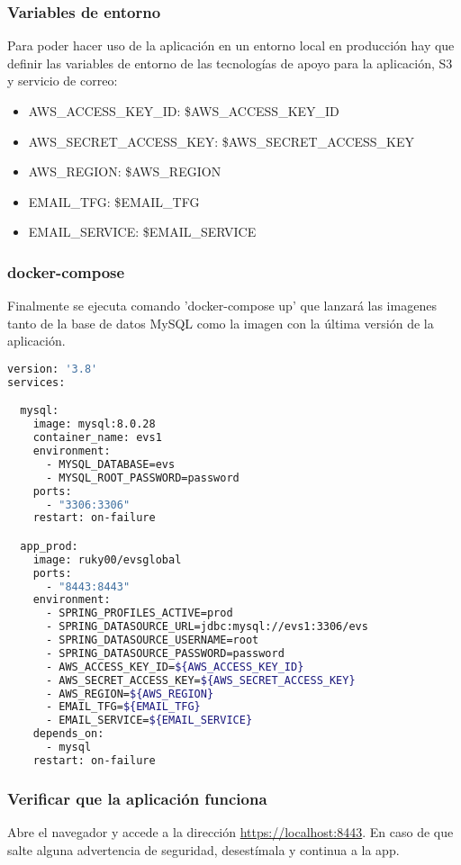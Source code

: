 \subsubsection{Variables de entorno}
Para poder hacer uso de la aplicación en un entorno local en producción hay que definir las variables de entorno de las tecnologías de apoyo para la aplicación, S3 y servicio de correo:
\begin{itemize}
    \item AWS\_ACCESS\_KEY\_ID: \${AWS\_ACCESS\_KEY\_ID}
    \item AWS\_SECRET\_ACCESS\_KEY: \${AWS\_SECRET\_ACCESS\_KEY}
    \item AWS\_REGION: \${AWS\_REGION}
    \item EMAIL\_TFG: \${EMAIL\_TFG}
    \item EMAIL\_SERVICE: \${EMAIL\_SERVICE}
\end{itemize}

\subsubsection{docker-compose}
Finalmente se ejecuta comando 'docker-compose up' que lanzará las imagenes tanto de la base de datos MySQL como la imagen con la última versión de la aplicación.
\begin{lstlisting}[language=Bash, caption=Lanzar contenedores Docker, label=lst:docker-compose]
version: '3.8'
services:

  mysql:
    image: mysql:8.0.28
    container_name: evs1
    environment:
      - MYSQL_DATABASE=evs
      - MYSQL_ROOT_PASSWORD=password
    ports:
      - "3306:3306"
    restart: on-failure

  app_prod:
    image: ruky00/evsglobal
    ports:
      - "8443:8443"
    environment:
      - SPRING_PROFILES_ACTIVE=prod
      - SPRING_DATASOURCE_URL=jdbc:mysql://evs1:3306/evs
      - SPRING_DATASOURCE_USERNAME=root
      - SPRING_DATASOURCE_PASSWORD=password
      - AWS_ACCESS_KEY_ID=${AWS_ACCESS_KEY_ID}
      - AWS_SECRET_ACCESS_KEY=${AWS_SECRET_ACCESS_KEY}
      - AWS_REGION=${AWS_REGION}
      - EMAIL_TFG=${EMAIL_TFG}
      - EMAIL_SERVICE=${EMAIL_SERVICE}
    depends_on:
      - mysql
    restart: on-failure


\end{lstlisting}

\subsubsection{Verificar que la aplicación funciona}
Abre el navegador y accede a la dirección \href{https://localhost:8443}{https://localhost:8443}. En caso de que salte alguna advertencia de seguridad, desestímala y continua a la app.

